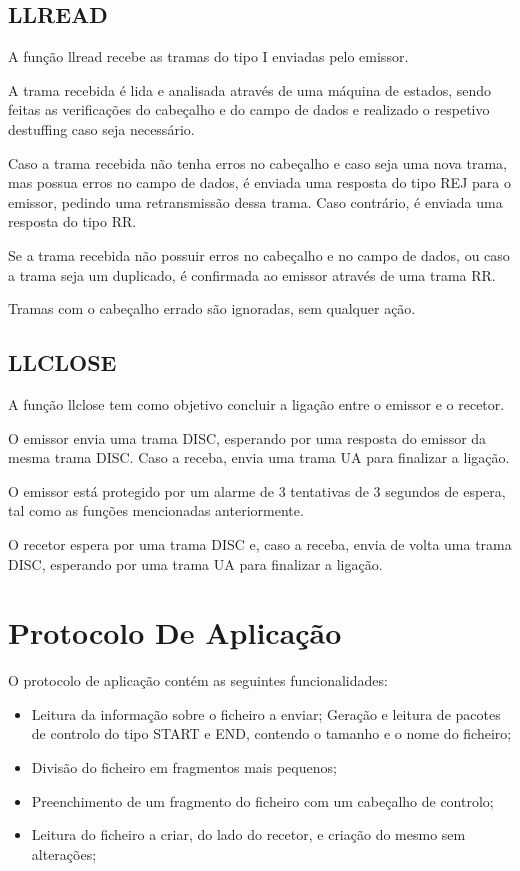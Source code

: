 \documentclass{article}
\begin{document}
\subsection{LLREAD}

A função llread recebe as tramas do tipo I enviadas pelo emissor.

A trama recebida é lida e analisada através de uma máquina de estados, sendo feitas as verificações do cabeçalho e do campo de dados e realizado o respetivo destuffing caso seja necessário.

Caso a trama recebida não tenha erros no cabeçalho e caso seja uma nova trama, mas possua erros no campo de dados, é enviada uma resposta do tipo REJ para o emissor, pedindo uma retransmissão dessa trama. Caso contrário, é enviada uma resposta do tipo RR.

Se a trama recebida não possuir erros no cabeçalho e no campo de dados, ou caso a trama seja um duplicado, é confirmada ao emissor através de uma trama RR.

Tramas com o cabeçalho errado são ignoradas, sem qualquer ação.

\subsection{LLCLOSE}
A função llclose tem como objetivo concluir a ligação entre o emissor e o recetor.

O emissor envia uma trama DISC, esperando por uma resposta do emissor da mesma trama DISC. Caso a receba, envia uma trama UA para finalizar a ligação.

O emissor está protegido por um alarme de 3 tentativas de 3 segundos de espera, tal como as funções mencionadas anteriormente.

O recetor espera por uma trama DISC e, caso a receba, envia de volta uma trama DISC, esperando por uma trama UA para finalizar a ligação.


\section{Protocolo De Aplicação}
O protocolo de aplicação contém as seguintes funcionalidades:

\begin{itemize}
	\item Leitura da informação sobre o ficheiro a enviar;
	Geração e leitura de pacotes de controlo do tipo START e END, contendo o tamanho e o nome do ficheiro;
	\item Divisão do ficheiro em fragmentos mais pequenos;
	\item Preenchimento de um fragmento do ficheiro com um cabeçalho de controlo;
	\item Leitura do ficheiro a criar, do lado do recetor, e criação do mesmo sem alterações;

\end{itemize}
\end{document}
